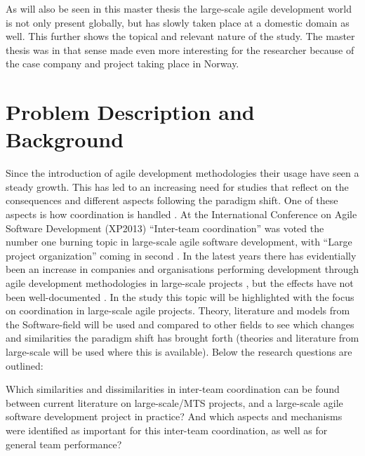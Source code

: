 As will also be seen in this master thesis the large-scale agile development world is not only present globally, but has slowly taken place at a domestic domain as well. This further shows the topical and relevant nature of the study. The master thesis was in that sense made even more interesting for the researcher because of the case company and project taking place in Norway.

\section{Problem Description and Background}
\label{pdab}

Since the introduction of agile development methodologies their usage have seen a steady growth. This has led to an increasing need for studies that reflect on the consequences and different aspects following the paradigm shift. One of these aspects is how coordination is handled \cite{Agerfalk2006, Leffingwell2007, Cockburn2002, Batra2010}. At the International Conference on Agile Software Development (XP2013) ``Inter-team coordination'' was voted the number one burning topic in large-scale agile software development, with ``Large project organization'' coming in second \cite{Dingsoyr2013b}.  In the latest years there has evidentially been an increase in companies and organisations performing development through agile development methodologies in large-scale projects \cite{Paasivaara2012, Com2013, Vlietland2015, Lindvall2004, Dingsoyr2013b, Lee2008, Paasivaara2009}, but the effects have not been well-documented \cite{Pikkarainen2008, Paasivaara2012, Freudenberg2010, Haaster2014, Dingsoyr2013a, Reifer2003}. In the study this topic will be highlighted with the focus on coordination in large-scale agile projects. Theory, literature and models from the Software-field will be used and compared to other fields to see which changes and similarities the paradigm shift has brought forth (theories and literature from large-scale will be used where this is available). Below the research questions are outlined:

\begin{fancyquotes}
Which similarities and dissimilarities in inter-team coordination can be found between current literature on large-scale/MTS projects, and a large-scale agile software development project in practice? And which aspects and mechanisms were identified as important for this inter-team coordination, as well as for general team performance?
\end{fancyquotes}

